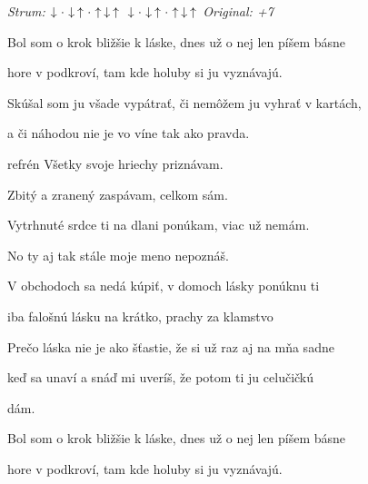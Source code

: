 \begin{song}


 \quad
\textit{Strum:} $\Down\Miss\Down\Up\Miss\Up\Down\Up$ $\Down\Miss\Down\Up\Miss\Up\Down\Up$ \quad
\textit{Original: +7}

\large


\Large

\bigskip

Bol som o krok bližšie k láske, dnes už o nej len píšem básne \par
hore v podkroví, tam kde holuby si ju vyznávajú. \par
{}Skúšal som ju všade vypátrať, či nemôžem ju vyhrať v kartách, \par
a či náhodou nie je vo víne tak ako pravda. \par

\bigskip

 

\bigskip

\begin{chorusbox}{refrén}
Všetky svoje hriechy priznávam. \par
{}Zbitý a zranený zaspávam, celkom sám. \par
Vytrhnuté srdce ti na dlani ponúkam, viac už nemám. \par
No ty aj tak stále moje meno nepoznáš. \par
\end{chorusbox}

\bigskip

V obchodoch sa nedá kúpiť, v domoch lásky ponúknu ti \par
iba falošnú lásku na krátko, prachy za klamstvo \par
Prečo láska nie je ako šťastie, že si už raz aj na mňa sadne \par
keď sa unaví a snáď mi uveríš, že potom ti ju celučičkú \par

\bigskip

dám.  \par

\bigskip


\bigskip

Bol som o krok bližšie k láske, dnes už o nej len píšem básne \par
hore v podkroví, tam kde holuby si ju vyznávajú. \par

\bigskip

 

\end{song}
